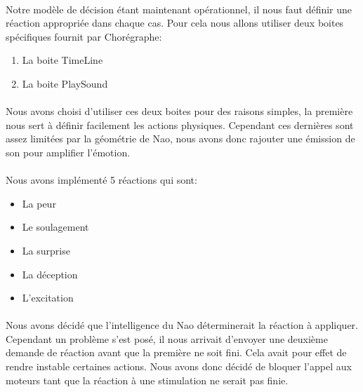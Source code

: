 \paragraph{}
Notre modèle de décision étant maintenant opérationnel, il nous faut définir une
réaction appropriée dans chaque cas. Pour cela nous allons utiliser deux boites
spécifiques fournit par Chorégraphe:\\
\begin{enumerate}
  \item La boite TimeLine
  \item La boite PlaySound
\end{enumerate}

\paragraph{}
Nous avons choisi d'utiliser ces deux boites pour des raisons simples, la
première nous sert à définir facilement les actions physiques. Cependant ces
dernières sont assez limitées par la géométrie de Nao, nous avons donc rajouter
une émission de son pour amplifier l'émotion.

\paragraph{}
Nous avons implémenté 5 réactions qui sont:\\
\begin{itemize}
  \item La peur
  \item Le soulagement
  \item La surprise
  \item La déception
  \item L'excitation
\end{itemize}


\paragraph{}
Nous avons décidé que l'intelligence du Nao déterminerait la réaction à
appliquer. Cependant un problème s'est posé, il nous arrivait d'envoyer une
deuxième demande de réaction avant que la première ne soit fini. Cela avait pour
effet de rendre instable certaines actions. Nous avons donc décidé de bloquer
l'appel aux moteurs tant que la réaction à une stimulation ne serait pas finie.
